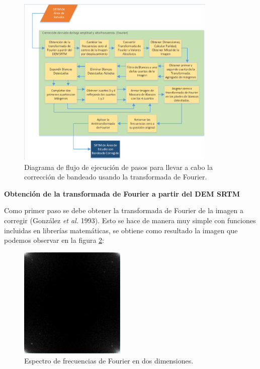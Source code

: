 \documentclass[10pt,a4paper, twoside]{report}
\begin{document}
\begin{figure}[!htb]
   \centering      
   \includegraphics[width=0.85\textwidth]{imagenes/DiagramaFourier.pdf}
 \caption{Diagrama de flujo de ejecución de pasos para llevar a cabo la corrección de bandeado usando la transformada de Fourier.}
 \label{DiagramaFourier}
\end{figure}


\textbf{Obtención de la transformada de Fourier a partir del DEM SRTM}

Como primer paso se debe obtener la transformada de Fourier de la imagen a corregir (González \textit{et al.} 1993). Esto se hace de manera muy simple con funciones incluidas en librerías matemáticas, se obtiene como resultado la imagen que podemos observar en la figura \ref{FourierNoCentrada}:

\begin{figure}[!htb]
   \centering      
   \includegraphics[width=0.45\textwidth]{imagenes/FourierNoCentrada.jpg}
 \caption{Espectro de frecuencias de Fourier en dos dimensiones.}
 \label{FourierNoCentrada}
\end{figure}
\end{document}
